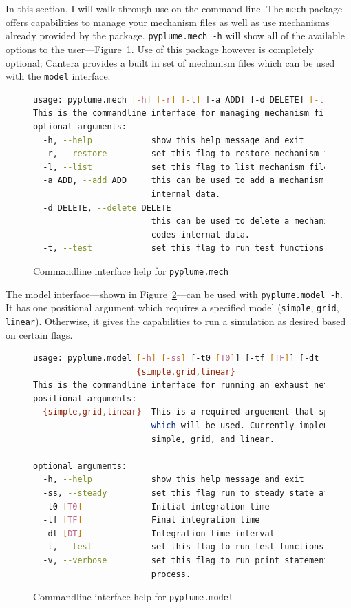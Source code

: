\documentclass[smallextended,referee]{svjour3}
\newenvironment{codeblock}[1]
{
\begin{figure}[hbt]
\newcommand{\captionMacro}{#1}
\centering
\begin{tcolorbox}[width=15cm]
}
{
\end{tcolorbox}
\caption{\captionMacro{}}
\end{figure}
}
\begin{document}
In this section, I will walk through use on the command line. The \texttt{mech} package offers capabilities to manage your mechanism files as well as use mechanisms already provided by the package. \texttt{pyplume.mech -h} will show all of the available options to the user---Figure~\ref{code:mech}. Use of this package however is completely optional; Cantera provides a built in set of mechanism files which can be used with the \texttt{model} interface.

\begin{codeblock}{Commandline interface help for \texttt{pyplume.mech}}
\begin{lstlisting}[language=bash]
usage: pyplume.mech [-h] [-r] [-l] [-a ADD] [-d DELETE] [-t]
This is the commandline interface for managing mechanism files of PyPlume.
optional arguments:
  -h, --help            show this help message and exit
  -r, --restore         set this flag to restore mechanism files.
  -l, --list            set this flag to list mechanism files.
  -a ADD, --add ADD     this can be used to add a mechanism file to the codes
                        internal data.
  -d DELETE, --delete DELETE
                        this can be used to delete a mechanism file to the
                        codes internal data.
  -t, --test            set this flag to run test functions.
\end{lstlisting}
\label{code:mech}
\end{codeblock}

The model interface---shown in Figure~\ref{code:model}---can be used with \texttt{pyplume.model -h}. It has one positional argument which requires a specified model (\texttt{simple}, \texttt{grid}, \texttt{linear}).
Otherwise, it gives the capabilities to run a simulation as desired based on certain flags.

\begin{codeblock}{Commandline interface help for \texttt{pyplume.model}}
\begin{lstlisting}[language=bash]
usage: pyplume.model [-h] [-ss] [-t0 [T0]] [-tf [TF]] [-dt [DT]] [-t] [-v]
                     {simple,grid,linear}
This is the commandline interface for running an exhaust network.
positional arguments:
  {simple,grid,linear}  This is a required arguement that specifies the model
                        which will be used. Currently implemented choices are
                        simple, grid, and linear.

optional arguments:
  -h, --help            show this help message and exit
  -ss, --steady         set this flag run to steady state after integration
  -t0 [T0]              Initial integration time
  -tf [TF]              Final integration time
  -dt [DT]              Integration time interval
  -t, --test            set this flag to run test functions.
  -v, --verbose         set this flag to run print statements during the
                        process.
\end{lstlisting}
\label{code:model}
\end{codeblock}
\end{document}
